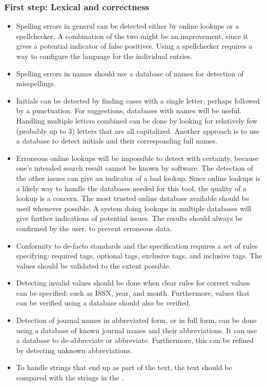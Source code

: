 \subsubsection{First step: Lexical and correctness}
\begin{itemize}
\item Spelling errors in general can be detected either by online
  lookups or a spellchecker.  A combination of the two might be an
  improvement, since it gives a potential indicator of false
  positives.  Using a spellchecker requires a way to configure the
  language for the individual entries.

\item Spelling errors in names should use a database of names for
  detection of misspellings.

\item Initials can be detected by finding cases with a single letter,
  perhaps followed by a punctuation.  For suggestions, databases with
  names will be useful.  Handling multiple letters combined can be
  done by looking for relatively few (probably up to 3) letters that
  are all capitalized.  Another approach is to use a database to
  detect initials and their corresponding full names.

\item Erroneous online lookups will be impossible to detect with
  certainty, because one's intended search result cannot be known by
  software.  The detection of the other issues can give an indicator
  of a bad lookup.  Since online lookups is a likely way to handle the
  databases needed for this tool, the quality of a lookup is a
  concern.  The most trusted online database available should be used
  whenever possible.  A system doing lookups in multiple databases
  will give further indications of potential issues.  The results
  should always be confirmed by the user, to prevent erroneous data.

\item Conformity to de-facto standards and the {\bibtex} specification
  requires a set of rules specifying: required tags, optional tags,
  exclusive tags, and inclusive tags.  The values should be validated
  to the extent possible.

\item Detecting invalid values should be done when clear rules for
  correct values can be specified: such as ISSN, year, and month.
  Furthermore, values that can be verified using a database should
  also be verified.

\item Detection of journal names in abbreviated form, or in full form,
  can be done using a database of known journal names and their
  abbreviations.  It can use a database to de-abbreviate or
  abbreviate.  Furthermore, this can be refined by detecting unknown
  abbreviations.

\item To handle {\bibtex} strings that end up as part of the text, the
  text should be compared with the strings in the .
\end{itemize}


